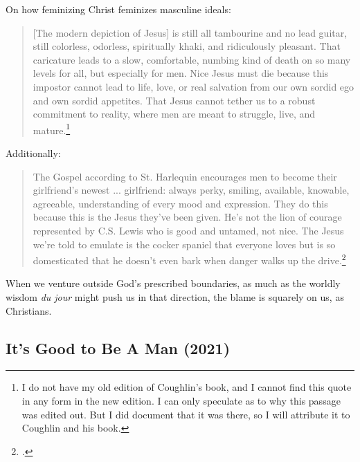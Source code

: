 \smallskip
\noindent
On how feminizing Christ feminizes masculine ideals:
\begin{quote}
[The modern depiction of Jesus] is still all tambourine and no lead guitar, still colorless, odorless, spiritually khaki, and ridiculously pleasant.  That caricature leads to a slow, comfortable, numbing kind of death on so many levels for all, but especially for men.  Nice Jesus must die because this impostor cannot lead to life, love, or real salvation from our own sordid ego and own sordid appetites.  That Jesus cannot tether us to a robust commitment to reality, where men are meant to struggle, live, and mature.\footnote{I do not have my old edition of Coughlin's book, and I cannot find this quote in any form in the new edition.  I can only speculate as to why this passage was edited out.  But I did document that it was there, so I will attribute it to Coughlin and his book.}
\end{quote}

\smallskip
\noindent
Additionally:
\begin{quote}
The Gospel according to St. Harlequin encourages men to become their girlfriend's newest ... girlfriend: always perky, smiling, available, knowable, agreeable, understanding of every mood and expression.  They do this because this is the Jesus they've been given.  He's not the lion of courage represented by C.S. Lewis who is good and untamed, not nice.  The Jesus we're told to emulate is the cocker spaniel that everyone loves but is so domesticated that he doesn't even bark when danger walks up the drive.\footcite[p. 83, also heavily edited in subsequent editions of Coughlin's work]{coughlinnice}
\end{quote}

\noindent
When we venture outside God's prescribed boundaries, as much as the worldly wisdom \textit{du jour} might push us in that direction, the blame is squarely on us, as Christians.  


\subsection{It's Good to Be A Man (2021)}

\ifdefined\embedversion\newpage\fi
